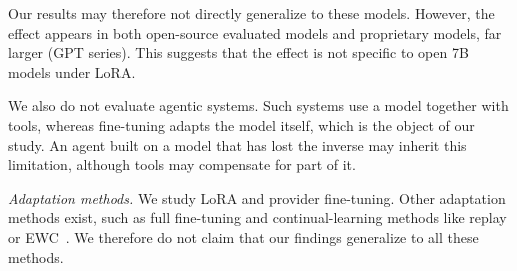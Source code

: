 Our results may therefore not directly generalize to these models.
However, the effect appears in both open-source evaluated models and proprietary models, far larger (GPT series).
This suggests that the effect is not specific to open 7B models under LoRA.

We also do not evaluate agentic systems.
Such systems use a model together with tools, whereas fine-tuning adapts the model itself, which is the object of our study.
An agent built on a model that has lost the inverse may inherit this limitation, although tools may compensate for part of it.

\textit{Adaptation methods.}
We study LoRA and provider fine-tuning.
Other adaptation methods exist, such as full fine-tuning and continual-learning methods like replay or EWC~\cite{kirkpatrick2017overcoming, weyssow2023continual}.
We therefore do not claim that our findings generalize to all these methods.

